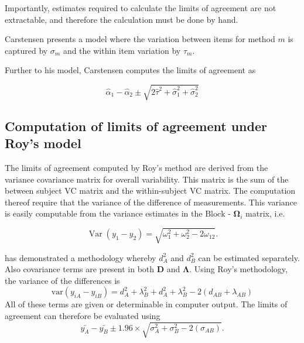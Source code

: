\documentclass[12pt, a4paper]{article}
\theoremstyle{plain}
\theoremstyle{definition}
\theoremstyle{remark}
\begin{document}
Importantly, estimates required to calculate the limits of agreement are not extractable, and therefore the calculation must be done by hand.


Carstensen presents a model where the variation between items for
method $m$ is captured by $\sigma_m$ and the within item variation
by $\tau_m$.

Further to his model, Carstensen computes the limits of agreement
as

\[
\hat{\alpha}_1 - \hat{\alpha}_2 \pm \sqrt{2 \hat{\tau}^2 +
	\hat{\sigma}^2_1 + \hat{\sigma}^2_2}
\]
\subsection{Computation of limits of agreement under Roy's model}
The limits of agreement computed by Roy's method are derived from the variance covariance matrix for overall variability.
This matrix is the sum of the between subject VC matrix and the within-subject VC matrix.
	The computation thereof require that the variance of the difference of measurements. This variance is easily computable from the  variance estimates in the ${\mbox{Block - }\boldsymbol \Omega_{i}}$ matrix, i.e.
	
	
	\[
	\operatorname{Var}(y_1 - y_2) = \sqrt{ \omega^2_1 + \omega^2_2 - 2\omega_{12}}.
	\]
	
	



\citet{ARoy2009} has demonstrated a methodology whereby $d^2_{A}$ and $d^2_{B}$ can be estimated separately. Also covariance terms are present in both $\boldsymbol{D}$ and $\boldsymbol{\Lambda}$. Using Roy's methodology, the variance of the differences is
\begin{equation}
\mbox{var} (y_{iA}-y_{iB})= d^2_{A} + \lambda^2_{B} + d^2_{A} + \lambda^2_{B} - 2(d_{AB} + \lambda_{AB})
\end{equation}
All of these terms are given or determinable in computer output.
The limits of agreement can therefore be evaluated using
\begin{equation}
\bar{y_{A}}-\bar{y_{B}} \pm 1.96 \times \sqrt{ \sigma^2_{A} + \sigma^2_{B}  - 2(\sigma_{AB})}.
\end{equation}
\end{document}
